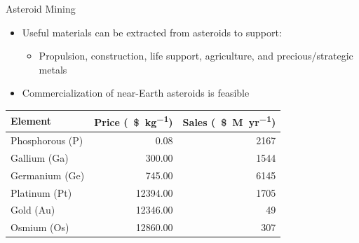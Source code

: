 \begin{frame}{Asteroid Mining}
    \begin{itemize}
      \item Useful materials can be extracted from asteroids to support:
      \begin{itemize}
          \item Propulsion, construction, life support, agriculture, and precious/strategic metals
      \end{itemize}
      \item Commercialization of near-Earth asteroids is feasible
    \end{itemize}

\pause

\begin{center}
\small
    \begin{tabular}{|l|r|r|}
        \hline 
        Element & Price (\SI{}{\$\per\kilo\gram}) & Sales (\SI{}{\$M\per yr}) \\
        \hline \hline 
        Phosphorous (P) & \num{0.08}  & \num{2167} \\
        Gallium (Ga) & \num{300.00}  & \num{1544} \\
        Germanium (Ge) & \num{745.00} & \num{6145} \\
        \hline \hline 
        Platinum (Pt) & \num{12394.00} & \num{1705} \\
        Gold (Au) & \num{12346.00} & \num{49} \\
        Osmium (Os) & \num{12860.00} & \num{307} \\
        \hline
    \end{tabular}
\end{center}

\end{frame}


